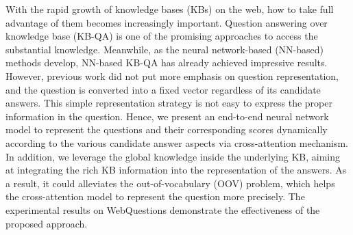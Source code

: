 With the rapid growth of knowledge bases (KBs) on the web, how to take full advantage of them becomes increasingly important. Question answering over knowledge base (KB-QA) is one of the  promising approaches to access the substantial knowledge. Meanwhile, as the neural network-based (NN-based) methods develop, NN-based KB-QA has already achieved impressive results. However, previous work did not put more emphasis on question representation, and the question is converted into a fixed vector regardless of its candidate answers. This simple representation strategy is not easy to express the proper information in the question. Hence, we present an end-to-end neural network model to represent the questions and their corresponding scores dynamically according to the various candidate answer aspects via cross-attention mechanism. In addition, we leverage the global knowledge inside the underlying KB, aiming at integrating the rich KB information into the representation of the answers. As a result, it could alleviates the out-of-vocabulary (OOV) problem, which helps the cross-attention model to represent the question more precisely. The experimental results on WebQuestions demonstrate the effectiveness of the proposed approach.
